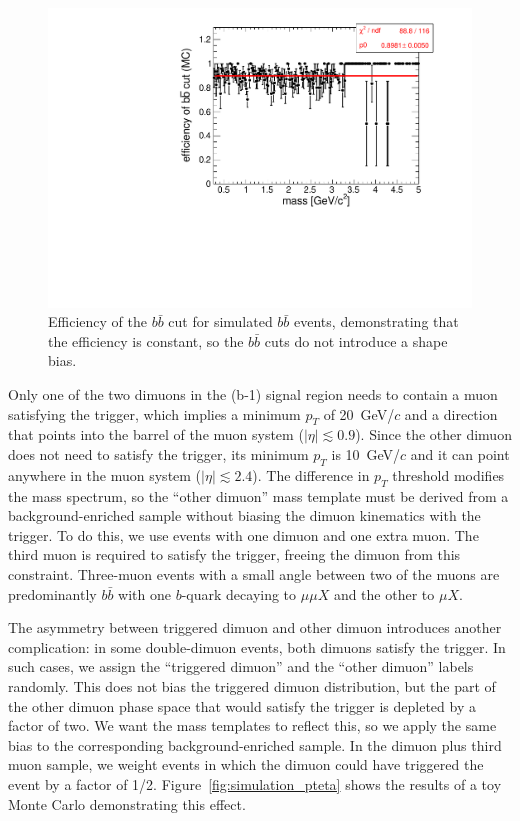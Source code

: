 \documentclass[12pt]{cms-tdr}
\begin{document}
\begin{figure}
\begin{center}
\includegraphics[width=0.6\linewidth]{PLOTS/support_bbbarcut_efficiency.pdf}
\end{center}

\caption{Efficiency of the $b\bar{b}$ cut for simulated $b\bar{b}$
  events, demonstrating that the efficiency is constant, so the
  $b\bar{b}$ cuts do not introduce a shape bias. \label{fig:support_bbbarcut_efficiency}}
\end{figure}

Only one of the two dimuons in the (b-1) signal region needs to
contain a muon satisfying the trigger, which implies a minimum $p_T$
of 20~GeV/$c$ and a direction that points into the barrel of the muon
system ($|\eta| \lesssim 0.9$).  Since the other dimuon does not need
to satisfy the trigger, its minimum $p_T$ is 10~GeV/$c$ and it can
point anywhere in the muon system ($|\eta| \lesssim 2.4$).  The
difference in $p_T$ threshold modifies the mass spectrum, so the
``other dimuon'' mass template must be derived from a
background-enriched sample without biasing the dimuon kinematics with
the trigger.  To do this, we use events with one dimuon and one extra
muon.  The third muon is required to satisfy the trigger, freeing the
dimuon from this constraint.  Three-muon events with a small angle
between two of the muons are predominantly $b\bar{b}$ with one
$b$-quark decaying to $\mu\mu X$ and the other to $\mu X$.

The asymmetry between triggered dimuon and other dimuon introduces
another complication: in some double-dimuon events, both dimuons
satisfy the trigger.  In such cases, we assign the ``triggered
dimuon'' and the ``other dimuon'' labels randomly.  This does not bias
the triggered dimuon distribution, but the part of the other dimuon
phase space that would satisfy the trigger is depleted by a factor of
two.  We want the mass templates to reflect this, so we apply the same
bias to the corresponding background-enriched sample.  In the dimuon
plus third muon sample, we weight events in which the dimuon could
have triggered the event by a factor of 1/2.
Figure~\ref{fig:simulation_pteta} shows the results of a toy Monte
Carlo demonstrating this effect.
\end{document}
